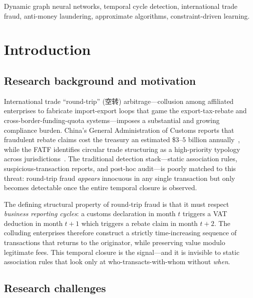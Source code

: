 \documentclass[journal,onecolumn]{IEEEtran}
\begin{document}
\begin{IEEEkeywords}
Dynamic graph neural networks, temporal cycle detection, international trade
fraud, anti-money laundering, approximate algorithms, constraint-driven
learning.
\end{IEEEkeywords}

\section{Introduction}
\label{sec:intro}

\subsection{Research background and motivation}
\label{sec:intro-bg}

International trade ``round-trip'' (空转) arbitrage---collusion among
affiliated enterprises to fabricate import-export loops that game the
export-tax-rebate and cross-border-funding-quota systems---imposes a
substantial and growing compliance burden. China's General Administration of
Customs reports that fraudulent rebate claims cost the treasury an
estimated \$$3$--$5$ billion annually~\cite{gaCustoms2023}, while the FATF
identifies circular trade structuring as a high-priority typology across
jurisdictions~\cite{fatfTypologies2022}. The traditional detection
stack---static association rules, suspicious-transaction reports, and
post-hoc audit---is poorly matched to this threat: round-trip fraud
\textit{appears} innocuous in any single transaction but only becomes
detectable once the entire temporal closure is observed.

The defining structural property of round-trip fraud is that it must
respect \emph{business reporting cycles}: a customs declaration in month
$t$ triggers a VAT deduction in month $t+1$ which triggers a rebate claim
in month $t+2$. The colluding enterprises therefore construct a strictly
time-increasing sequence of transactions that returns to the originator,
while preserving value modulo legitimate fees. This temporal closure is
the signal---and it is invisible to static association rules that look
only at who-transacts-with-whom without \emph{when}.

\subsection{Research challenges}
\label{sec:intro-challenges}
\end{document}
